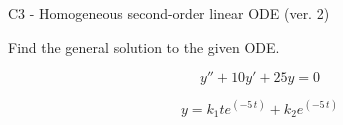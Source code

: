 \begin{exercise}
  \begin{exerciseTitle}C3 - Homogeneous second-order linear ODE (ver. 2)\end{exerciseTitle}
  \begin{exerciseStatement}
    
Find the general solution to the given ODE.

    
\[y''+10y'+25y = 0\]

  \end{exerciseStatement}
  \begin{exerciseAnswer}
    
\[y= k_{1} t e^{\left(-5 \, t\right)} + k_{2} e^{\left(-5 \, t\right)}\]

  \end{exerciseAnswer}
\end{exercise}